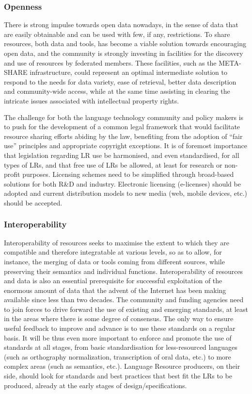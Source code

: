 \documentclass[10pt, plain]{../../metanetpaper}
\begin{document}
\begin{multicols}{2}
\subsubsection{Openness}
\label{sec:openness}

There is strong impulse towards open data nowadays, in the sense of data that are easily obtainable and can be used with few, if any, restrictions. To share resources, both data and tools, has become a viable solution towards encouraging open data, and the community is strongly investing in facilities for the discovery and use of resources by federated members. These facilities, such as the META-SHARE infrastructure, could represent an optimal intermediate solution to respond to the needs for data variety, ease of retrieval, better data description and community-wide access, while at the same time assisting in clearing the intricate issues associated with intellectual property rights.

The challenge for both the language technology community and policy makers is to push for the development of a common legal framework that would facilitate resource sharing efforts abiding by the law, benefiting from the adoption of “fair use” principles and appropriate copyright exceptions.  It is of foremost importance that legislation regarding LR use be harmonised, and even standardised, for all types of LRs, and that free use of LRs be allowed, at least for research or non-profit purposes. Licensing schemes need to be simplified through broad-based solutions for both R\&D and industry. Electronic licensing (e-licenses) should be adopted and current distribution models to new media (web, mobile devices, etc.) should be accepted.

\subsubsection{Interoperability}
\label{sec:interoperability}

Interoperability of resources seeks to maximise the extent to which they are compatible and therefore integratable at various levels, so as to allow, for instance, the merging of data or tools coming from different sources, while preserving their semantics and individual functions. Interoperability of resources and data is also an essential prerequisite for successful exploitation of the enormous amount of data that the advent of the Internet has been making available since less than two decades. The community and funding agencies need to join forces to drive forward the use of existing and emerging standards, at least in the areas where there is some degree of consensus. The only way to ensure useful feedback to improve and advance is to use these standards on a regular basis. It will be thus even more important to enforce and promote the use of standards at all stages, from basic standardisation for less-resourced languages (such as orthography normalization, transcription of oral data, etc.) to more complex areas (such as semantics, etc.). Language Resource producers, on their side, should look for standards and best practices that best fit the LRs to be produced, already at the early stages of design/specifications.


\end{multicols}
\end{document}
